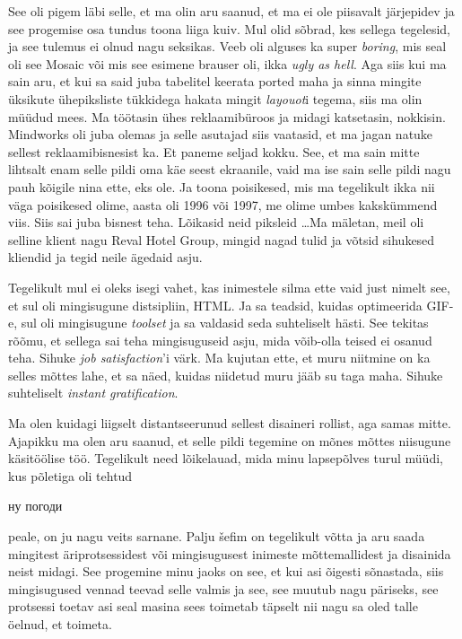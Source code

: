  
See oli pigem läbi selle, et ma olin aru saanud, et ma ei ole piisavalt järjepidev ja see progemise osa  tundus toona liiga kuiv. Mul olid sõbrad, kes sellega tegelesid, ja see tulemus ei olnud nagu seksikas. Veeb oli alguses ka super \emph{boring}, mis seal oli see Mosaic või mis see esimene brauser oli, ikka \emph{ugly as hell}. Aga siis kui ma sain aru, et kui sa said juba tabelitel keerata ported maha ja sinna mingite üksikute ühepiksliste tükkidega  hakata mingit \emph{layouot}i tegema, siis ma olin müüdud mees. Ma töötasin ühes reklaamibüroos ja midagi  katsetasin, nokkisin. Mindworks oli juba olemas ja selle asutajad siis vaatasid, et ma jagan natuke sellest reklaamibisnesist ka.  Et paneme seljad kokku. See, et ma sain mitte lihtsalt enam selle pildi oma käe seest ekraanile, vaid ma ise sain selle pildi nagu pauh kõigile nina ette, eks ole. Ja toona poisikesed, mis ma tegelikult ikka nii väga poisikesed olime, aasta oli 1996 või 1997, me olime umbes kakskümmend viis. Siis sai juba bisnest teha. Lõikasid neid piksleid \ldots Ma mäletan, meil oli selline klient nagu Reval Hotel Group, mingid nagad tulid ja võtsid sihukesed kliendid ja tegid neile ägedaid asju.


Tegelikult mul ei oleks isegi vahet, kas inimestele silma ette vaid just nimelt see, et sul oli mingisugune distsipliin, HTML. Ja sa teadsid, kuidas optimeerida GIF-e, sul oli mingisugune \emph{toolset} ja sa valdasid seda suhteliselt hästi. See tekitas rõõmu, et sellega sai teha mingisuguseid asju, mida võib-olla teised ei osanud teha. Sihuke \emph{job satisfaction}'i värk. Ma kujutan ette, et muru niitmine on ka selles mõttes lahe, et sa näed, kuidas niidetud muru jääb su taga maha. Sihuke suhteliselt \emph{instant gratification}.


Ma olen kuidagi liigselt distantseerunud sellest disaineri rollist, aga samas mitte. Ajapikku ma olen aru saanud, et selle pildi tegemine on mõnes mõttes niisugune käsitöölise töö. Tegelikult need lõikelauad, mida minu lapsepõlves turul müüdi, kus  põletiga oli tehtud \begin{russian}ну погоди\end{russian} peale, on ju nagu veits sarnane. Palju šefim on tegelikult võtta ja aru saada mingitest äriprotsessidest või mingisugusest inimeste mõttemallidest ja disainida neist midagi. See progemine minu jaoks on see, et kui asi õigesti sõnastada, siis mingisugused vennad teevad selle valmis ja see, see muutub nagu päriseks, see  protsessi toetav  asi seal masina sees toimetab täpselt nii nagu sa oled talle  öelnud, et toimeta. 

